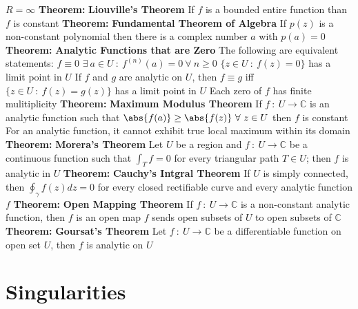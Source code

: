 \documentclass[14pt]{extarticle}
\def\Theorem{{\color{red} \textbf{Theorem:} }}
\begin{document}
\begin{outline}
		\2	$R = \infty$
	\1	\Theorem \textbf{Liouville's Theorem}
		\2	If $f$ is a bounded entire function than $f$ is constant
	\1	\Theorem \textbf{Fundamental Theorem of Algebra}
		\2	If $p(z)$ is a non-constant polynomial then there is a complex number
				$a$ with $p(a) = 0$
	\1	\Theorem	\textbf{Analytic Functions that are Zero}
		\2	The following are equivalent statements:
			\3	$f \equiv 0$
			\3	$\exists~a \in U~:~f^{(n)}(a) = 0~\forall~n \ge 0$
			\3	$\{z \in U~:~f(z) = 0\}$ has a limit point in $U$
		\2	If $f$ and $g$ are analytic on $U$, then $f \equiv g$ iff
				$\{z\in U~:~f(z) = g(z)\}$ has a limit point in $U$
		\2	Each zero of $f$ has finite mulitiplicity
	\1	\Theorem	\textbf{Maximum Modulus Theorem}
		\2	If $f~:~U \rightarrow \mathbb{C}$ is an analytic function such that
				$\abs{f(a)} \ge \abs{f(z)}~\forall~z \in U$ then $f$ is constant
		\2	For an analytic function, it cannot exhibit true local maximum within
				its domain
	\1	\Theorem	\textbf{Morera's Theorem}
		\2	Let $U$ be a region and $f~:~U \rightarrow \mathbb{C}$ be a continuous
				function such that $\int_T f = 0$ for every triangular path $T \in U$;
				then $f$ is analytic in $U$
	\1	\Theorem	\textbf{Cauchy's Intgral Theorem}
		\2	If $U$ is simply connected, then $\oint_{\gamma} f(z) dz = 0$ for every closed
				rectifiable curve and every analytic function $f$
	\1	\Theorem	\textbf{Open Mapping Theorem}
		\2	If $f~:~U \rightarrow \mathbb{C}$ is a non-constant analytic function,
				then $f$ is an open map
		\2	$f$ sends open subsets of $U$ to open subsets of $\mathbb{C}$
	\1	\Theorem	\textbf{Goursat's Theorem}
		\2	Let $f~:~U \rightarrow \mathbb{C}$ be a differentiable function on open
				set $U$, then $f$ is analytic on $U$
\section*{Singularities}
\end{outline}
\end{document}
